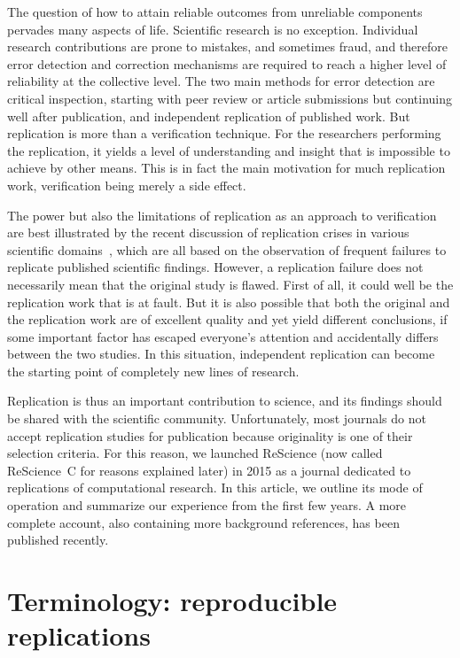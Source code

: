 \documentclass[runningheads]{llncs}
\begin{document}
The question of how to attain reliable outcomes from unreliable components pervades many aspects of life. Scientific research is no exception. Individual research contributions are prone to mistakes, and sometimes fraud, and therefore error detection and correction mechanisms are required to reach a higher level of reliability at the collective level. The two main methods for error detection are critical inspection, starting with peer review or article submissions but continuing well after publication, and independent replication of published work. But replication is more than a verification technique. For the researchers performing the replication, it yields a level of understanding and insight that is impossible to achieve by other means. This is in fact the main motivation for much replication work, verification being merely a side effect.

The power but also the limitations of replication as an approach to verification are best illustrated by the recent discussion of replication crises in various scientific domains~\cite{IoannidisWhyMostPublished2005,Baker500scientistslift2016,Munafomanifestoreproduciblescience2017,IqbalReproducibleResearchPractices2016}, which are all based on the observation of frequent failures to replicate published scientific findings. However, a replication failure does not necessarily mean that the original study is flawed. First of all, it could well be the replication work that is at fault. But it is also possible that both the original and the replication work are of excellent quality and yet yield different conclusions, if some important factor has escaped everyone's attention and accidentally differs between the two studies. In this situation, independent replication can become the starting point of completely new lines of research.

Replication is thus an important contribution to science, and its findings should be shared with the scientific community. Unfortunately, most journals do not accept replication studies for publication because originality is one of their selection criteria. For this reason, we launched ReScience (now called ReScience~C for reasons explained later) in 2015 as a journal dedicated to replications of computational research. In this article, we outline its mode of operation and summarize our experience from the first few years. A more complete account, also containing more background references, has been published recently.~\cite{RougierSustainablecomputationalscience2017}

\section{Terminology: reproducible replications}
\end{document}
